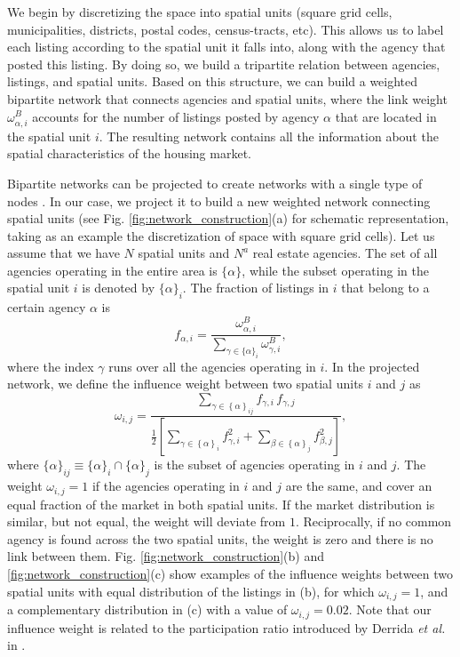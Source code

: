 We begin by discretizing the space into spatial units (square grid cells, municipalities, districts, postal codes, census-tracts, etc).
This allows us to label each listing according to the spatial unit it falls into, along with the agency that posted this listing. By doing so, we build a tripartite relation between agencies, listings, and spatial units. Based on this structure, we can build a weighted bipartite network that connects agencies and spatial units, where the link weight $\omega^{B}_{\alpha,i}$ accounts for the number of listings posted by agency $\alpha$ that are located in the spatial unit $i$. The resulting network contains all the information about the spatial characteristics of the housing market. 

Bipartite networks can be projected to create networks with a single type of nodes \cite{newman2001structure,newman2001scientific,zhou2007bipartite}. In our case, we project it to build a new weighted network connecting spatial units (see Fig. \ref{fig:network_construction}(a) for schematic representation, taking as an example the discretization of space with square grid cells). Let us assume that we have $N$ spatial units and $N^a$ real estate agencies. The set of all agencies operating in the entire area is $\{ \alpha \}$, while the subset operating in the spatial unit $i$ is denoted by $\{ \alpha \}_i$. The fraction of listings in $i$ that belong to a certain agency $\alpha$ is
\begin{equation}
    f_{\alpha, i} = \frac{\omega^{B}_{\alpha, i}}{\sum_{\gamma \in \{ \alpha \}_i} \omega^{B}_{\gamma, i}},
\end{equation}
where the index $\gamma$ runs over all the agencies operating in $i$. In the projected network, we define the influence weight between two spatial units $i$ and $j$ as
\begin{equation}
\omega_{i,j} = \frac{\sum_{\gamma \in \left\{ \alpha \right\}_{ij}} f_{\gamma,i} \, f_{\gamma,j}}{ \frac{1}{2} \left[ \sum_{\gamma \in \left\{ \alpha \right\}_{i}} f^2_{\gamma, i} + \sum_{\beta \in \left\{ \alpha \right\}_{j}} f^2_{\beta, j} \right]},
\label{eq:weight_eq}
\end{equation}
where $\{ \alpha \}_{ij} \equiv \{\alpha\}_i \cap \{\alpha\}_j$ is the subset of agencies operating in $i$ and $j$. The weight $\omega_{i,j} =1 $ if the agencies operating in $i$ and $j$ are the same, and cover an equal fraction of the market in both spatial units. If the market distribution is similar, but not equal, the weight will deviate from $1$. Reciprocally, if no common agency is found across the two spatial units, the weight is zero and there is no link between them. Fig. \ref{fig:network_construction}(b) and \ref{fig:network_construction}(c) show examples of the influence weights between two spatial units with equal distribution of the listings in (b), for which $\omega_{i,j} =1 $, and a complementary distribution in (c) with a value of $\omega_{i,j} = 0.02$. Note that our influence weight is related to the participation ratio introduced by Derrida \textit{et al.} in \cite{Derrida_1987}. 

